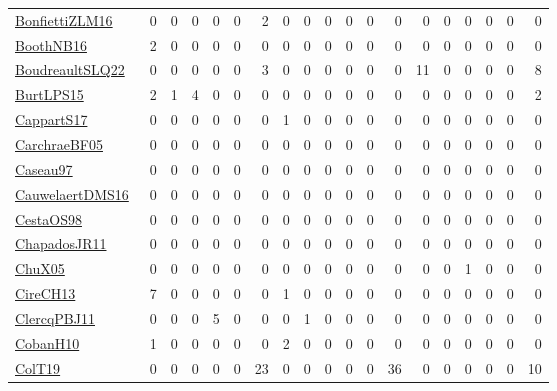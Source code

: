 {\begin{longtable}{l*{18}{r}}
\href{papers/BonfiettiZLM16.pdf}{BonfiettiZLM16}~\cite{BonfiettiZLM16} & 0 & 0 & 0 & 0 & 0 & 2 & 0 & 0 & 0 & 0 & 0 & 0 & 0 & 0 & 0 & 0 & 0 & 0\\
\href{papers/BoothNB16.pdf}{BoothNB16}~\cite{BoothNB16} & 2 & 0 & 0 & 0 & 0 & 0 & 0 & 0 & 0 & 0 & 0 & 0 & 0 & 0 & 0 & 0 & 0 & 0\\
\href{papers/BoudreaultSLQ22.pdf}{BoudreaultSLQ22}~\cite{BoudreaultSLQ22} & 0 & 0 & 0 & 0 & 0 & 3 & 0 & 0 & 0 & 0 & 0 & 0 & 11 & 0 & 0 & 0 & 0 & 8\\
\href{papers/BurtLPS15.pdf}{BurtLPS15}~\cite{BurtLPS15} & 2 & 1 & 4 & 0 & 0 & 0 & 0 & 0 & 0 & 0 & 0 & 0 & 0 & 0 & 0 & 0 & 0 & 2\\
\href{papers/CappartS17.pdf}{CappartS17}~\cite{CappartS17} & 0 & 0 & 0 & 0 & 0 & 0 & 1 & 0 & 0 & 0 & 0 & 0 & 0 & 0 & 0 & 0 & 0 & 0\\
\href{papers/CarchraeBF05.pdf}{CarchraeBF05}~\cite{CarchraeBF05} & 0 & 0 & 0 & 0 & 0 & 0 & 0 & 0 & 0 & 0 & 0 & 0 & 0 & 0 & 0 & 0 & 0 & 0\\
\href{papers/Caseau97.pdf}{Caseau97}~\cite{Caseau97} & 0 & 0 & 0 & 0 & 0 & 0 & 0 & 0 & 0 & 0 & 0 & 0 & 0 & 0 & 0 & 0 & 0 & 0\\
\href{papers/CauwelaertDMS16.pdf}{CauwelaertDMS16}~\cite{CauwelaertDMS16} & 0 & 0 & 0 & 0 & 0 & 0 & 0 & 0 & 0 & 0 & 0 & 0 & 0 & 0 & 0 & 0 & 0 & 0\\
\href{papers/CestaOS98.pdf}{CestaOS98}~\cite{CestaOS98} & 0 & 0 & 0 & 0 & 0 & 0 & 0 & 0 & 0 & 0 & 0 & 0 & 0 & 0 & 0 & 0 & 0 & 0\\
\href{papers/ChapadosJR11.pdf}{ChapadosJR11}~\cite{ChapadosJR11} & 0 & 0 & 0 & 0 & 0 & 0 & 0 & 0 & 0 & 0 & 0 & 0 & 0 & 0 & 0 & 0 & 0 & 0\\
\href{papers/ChuX05.pdf}{ChuX05}~\cite{ChuX05} & 0 & 0 & 0 & 0 & 0 & 0 & 0 & 0 & 0 & 0 & 0 & 0 & 0 & 0 & 1 & 0 & 0 & 0\\
\href{papers/CireCH13.pdf}{CireCH13}~\cite{CireCH13} & 7 & 0 & 0 & 0 & 0 & 0 & 1 & 0 & 0 & 0 & 0 & 0 & 0 & 0 & 0 & 0 & 0 & 0\\
\href{papers/ClercqPBJ11.pdf}{ClercqPBJ11}~\cite{ClercqPBJ11} & 0 & 0 & 0 & 5 & 0 & 0 & 0 & 1 & 0 & 0 & 0 & 0 & 0 & 0 & 0 & 0 & 0 & 0\\
\href{papers/CobanH10.pdf}{CobanH10}~\cite{CobanH10} & 1 & 0 & 0 & 0 & 0 & 0 & 2 & 0 & 0 & 0 & 0 & 0 & 0 & 0 & 0 & 0 & 0 & 0\\
\href{papers/ColT19.pdf}{ColT19}~\cite{ColT19} & 0 & 0 & 0 & 0 & 0 & 23 & 0 & 0 & 0 & 0 & 0 & 36 & 0 & 0 & 0 & 0 & 0 & 10\\

\end{longtable}}

